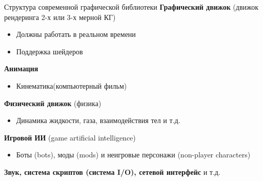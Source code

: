 \documentclass{beamer}
\begin{document}
\begin{frame}{Структура современной графической библиотеки}
	\textbf{Графический движок} (движок рендеринга 2-х или 3-х мерной КГ)


	\begin{itemize}
		\item
		      Должны работать в реальном времени
		\item
		      Поддержка шейдеров
	\end{itemize}

	\textbf{Анимация}
	\begin{itemize}
		\item
		      Кинематика(компьютерный фильм)
	\end{itemize}

	\textbf{Физический движок }(физика)
	\begin{itemize}
		\item
		      Динамика жидкости, газа, взаимодействия тел и т.д.
	\end{itemize}

	\textbf{Игровой ИИ} (game artificial intelligence)
	\begin{itemize}
		\item
		      Боты (bots), моды (mods) и неигровые персонажи (non-player characters)
	\end{itemize}

	\textbf{Звук, система скриптов (система I/O), сетевой интерфейс} и т.д.
\end{frame}
\end{document}
